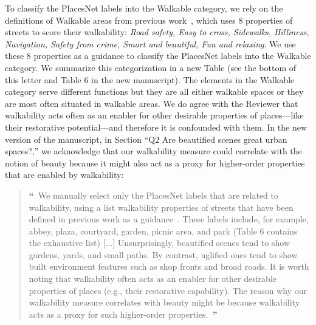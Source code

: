 \documentclass{paper}
\begin{document}
To classify the PlacesNet labels into the Walkable category, we rely on the definitions of Walkable areas from previous work~\cite{quercia2015digital}, which uses 8 properties of streets to score their walkability: \textit{Road safety, Easy to cross, Sidewalks, Hilliness, Navigation, Safety from crime, Smart and beautiful, Fun and relaxing}. We use these 8 properties as a guidance to classify the PlacesNet labels into the Walkable category. We summarize this categorization in a new Table (see the bottom of this letter and Table 6 in the new manuscript). The elements in the Walkable category serve different functions but they are all either walkable spaces or they are most often situated in walkable areas. We do agree with the Reviewer that walkability acts often as an enabler for other desirable properties of places---like their restorative potential---and therefore it is confounded with them. In the new version of the manuscript, in Section ``Q2 Are beautified scenes great urban spaces?,'' we acknowledge that our walkability measure could correlate with the notion of beauty because it might also act as a proxy for higher-order properties that are enabled by walkability:

\begin{quote}
{\bf \Large ``}~We manually select only the PlacesNet labels that are related to walkability, using a list walkability properties of streets that have been defined in previous work as a guidance~\cite{quercia2015digital}. These labels include, for example, abbey, plaza, courtyard, garden, picnic area, and park (Table 6 contains the exhaustive list) [...] Unsurprisingly, beautified scenes tend to show gardens, yards, and small paths. By contrast, uglified ones tend to show built environment features such as shop fronts and broad roads. It is worth noting that walkability often acts as an enabler for other desirable properties of places (e.g., their restorative capability). The reason why our walkability measure correlates with beauty might be because walkability acts as a proxy for such higher-order properties.~{\bf \Large ''}
\end{quote}


\end{document}
